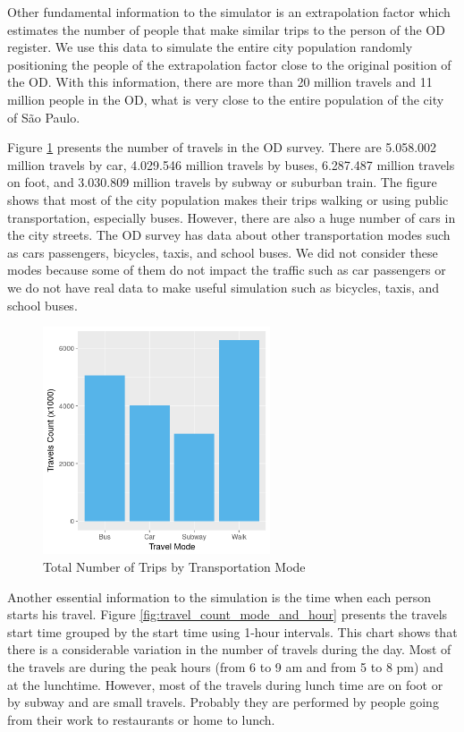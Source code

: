 Other fundamental information to the simulator is an extrapolation factor which estimates the number of people that make similar trips to the person of the OD register. We use this data to simulate the entire city population randomly positioning the people of the extrapolation factor close to the original position of the OD. With this information, there are more than 20 million travels and 11 million people in the OD, what is very close to the entire population of the city of S\~ao Paulo. 

Figure \ref{fig:travel_count_mode} presents the number of travels in the OD survey. There are 5.058.002 million travels by car, 4.029.546 million travels by buses, 6.287.487 million travels on foot, and 3.030.809 million travels by subway or suburban train. The figure shows that most of the city population makes their trips walking or using public transportation, especially buses. However, there are also a huge number of cars in the city streets. The OD survey has data about other transportation modes such as cars passengers, bicycles, taxis, and school buses. We did not consider these modes because some of them do not impact the traffic such as car passengers or we do not have real data to make useful simulation such as bicycles, taxis, and school buses.

\begin{figure}[!htb]
\centering
\includegraphics[width=0.6\textwidth]{figuras/chap-sp/travel_count.png}
\caption{Total Number of Trips by Transportation Mode}
\label{fig:travel_count_mode}
\end{figure}

Another essential information to the simulation is the time when each person starts his travel. Figure \ref{fig:travel_count_mode_and_hour} presents the travels start time grouped by the start time using 1-hour intervals. This chart shows that there is a considerable variation in the number of travels during the day. Most of the travels are during the peak hours (from 6 to 9 am and from 5 to 8 pm) and at the lunchtime. However, most of the travels during lunch time are on foot or by subway and are small travels. Probably they are performed by people going from their work to restaurants or home to lunch.

